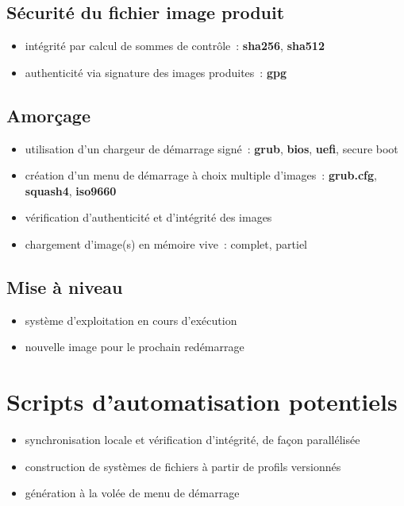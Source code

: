 \documentclass[10pt]{article}
\newenvironment{itmz}{\begin{itemize}
\setlength{\itemsep}{0em}
}{\end{itemize}}
\begin{document}
\subsection{Sécurité du fichier image produit}

\begin{itmz}
\item{intégrité par calcul de sommes de contrôle : \textbf{sha256}, \textbf{sha512}}
\item{authenticité via signature des images produites : \textbf{gpg}}
\end{itmz}

\subsection{Amorçage}

\begin{itmz}
\item{utilisation d’un chargeur de démarrage signé : \textbf{grub}, \textbf{bios}, \textbf{uefi}, secure boot}
\item{création d’un menu de démarrage à choix multiple d’images : \textbf{grub.cfg}, \textbf{squash4}, \textbf{iso9660}}
\item{vérification d’authenticité et d’intégrité des images}
\item{chargement d’image(s) en mémoire vive : complet, partiel}
\end{itmz}

\subsection{Mise à niveau}

\begin{itmz}
\item{système d’exploitation en cours d’exécution}
\item{nouvelle image pour le prochain redémarrage}
\end{itmz}

\section{Scripts d’automatisation potentiels}

\begin{itmz}
\item{synchronisation locale et vérification d’intégrité, de façon parallélisée}
\item{construction de systèmes de fichiers à partir de profils versionnés}
\item{génération à la volée de menu de démarrage}
\end{itmz}
\end{document}
